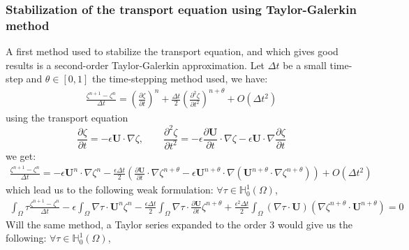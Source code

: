 \documentclass[11pt,a4paper]{article}
\begin{document}
					\subsubsection{Stabilization of the transport equation using Taylor-Galerkin method}
					A first method used to stabilize the transport equation, and which gives good results is a second-order Taylor-Galerkin approximation.
					Let $\Delta t$ be a small time-step and $\theta \in [0,1]$ the time-stepping method used, we have:	
					\begin{align}
						\displaystyle \frac{\zeta^{n+1} - \zeta^n}{\Delta t} = \left(\frac{\partial \zeta}{\partial t} \right)^n + \frac{\Delta t}{2} \left(\frac{\partial^2 \zeta}{\partial t^2} \right)^{n+\theta} + O(\Delta t^2)
					\end{align}
					using the transport equation
					\begin{equation}
						\displaystyle \frac{\partial \zeta}{\partial t} = - \epsilon \mathbf{U} \cdot \nabla \zeta, \qquad \displaystyle \frac{\partial^2 \zeta}{\partial t^2} = - \epsilon \frac{\partial \mathbf{U}}{\partial t} \cdot \nabla \zeta - \epsilon \mathbf{U} \cdot \nabla \frac{\partial \zeta}{\partial t}
					\end{equation}
					we get:
					\begin{align}
						\displaystyle \frac{\zeta^{n+1} - \zeta^n}{\Delta t} =- \epsilon \mathbf{U}^n \cdot \nabla \zeta^n - \frac{\epsilon \Delta t}{2} \left(\frac{\partial \mathbf{U}}{\partial t} \cdot \nabla \zeta^{n+\theta} - \epsilon \mathbf{U}^{n+\theta} \cdot \nabla (\mathbf{U}^{n+\theta} \cdot \nabla \zeta^{n+\theta})\right) + O(\Delta t^2)
					\end{align}
					which lead us to the following weak formulation: $\forall \tau \in \mathbb{H}^1_0(\Omega)$,
					\begin{align}
						\displaystyle \int_{\Omega}{\! \tau \frac{\zeta^{n+1} - \zeta^n}{\Delta t}}  -   \epsilon \int_{\Omega}{\! \nabla \tau \cdot  \mathbf{U}^n  \zeta^n} - \frac{\epsilon \Delta t}{2} \int_{\Omega}{\! \nabla \tau \cdot \frac{\partial \mathbf{U}}{\partial t} \zeta^{n+\theta}}
						 +  \frac{\epsilon^2 \Delta t}{2} \int_{\Omega}{\! (\nabla \tau \cdot \mathbf{U})(\nabla \zeta^{n+\theta} \cdot \mathbf{U}^{n+\theta})} = 0
					\end{align}
					Will the same method, a Taylor series expanded to the order 3 would give us the following:  $\forall \tau \in \mathbb{H}^1_0(\Omega)$,
\end{document}
